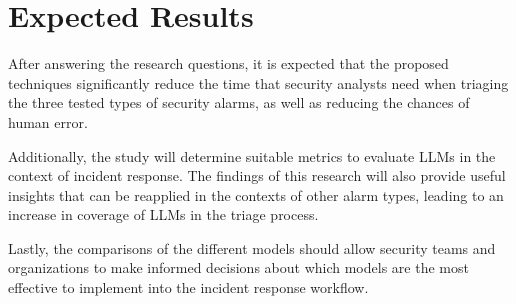\section{Expected Results}
\label{sec:expected-results}

After answering the research questions, it is expected that the proposed techniques significantly reduce the time that
security analysts need when triaging the three tested types of security alarms, as well as reducing the chances of
human error.

Additionally, the study will determine suitable metrics to evaluate LLMs in the context of incident response.
The findings of this research will also provide useful insights that can be reapplied in the contexts of other
alarm types, leading to an increase in coverage of LLMs in the triage process.

Lastly, the comparisons of the different models should allow security teams and organizations to make informed decisions
about which models are the most effective to implement into the incident response workflow.